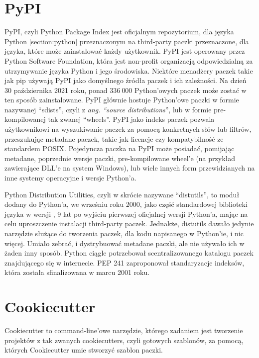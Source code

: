 \section{PyPI}
\label{section:pypi}
PyPI, \cite{PyPI} \cite{AdvancedPythonDevelopment} czyli Python Package Index jest oficjalnym repozytorium, dla języka Python \ref{section:python} przeznaczonym na third-party paczki przeznaczone, dla języka, które może zainstalować każdy użytkownik. PyPI jest operowany przez Python Software Foundation, która jest non-profit organizacją odpowiedzialną za utrzymywanie języka Python i jego  środowiska. Niektóre menadżery paczek takie jak pip \cite{Pip} używają PyPI jako domyślnego źródła paczek i ich zależności. Na dzień 30 października 2021 roku, ponad $336 \ 000$ Python'owych paczek może zostać w ten sposób zainstalowane. PyPI głównie hostuje Python'owe paczki w formie nazywanej ``sdists'', czyli z \textit{ang. ``source distributions}'', lub w formie pre-kompilowanej tak zwanej ``wheels''. PyPI jako indeks paczek pozwala użytkownikowi na wyszukiwanie paczek za pomocą konkretnych słów lub filtrów, przeszukując metadane paczek, takie jak licencje czy kompatybilność ze standardem POSIX. Pojedyncza paczka na PyPI może posiadać, pomijając metadane, poprzednie wersje paczki, pre-kompilowane wheel'e (na przykład zawierające DLL'e na system Windows), lub wiele innych form przewidzianych na inne systemy operacyjne i wersje Python'a.

Python Distribution Utilities, czyli w skrócie nazywane ``distutils'', to moduł dodany do Python'a, we wrześniu roku 2000, jako część standardowej biblioteki języka w wersji , 9 lat po wyjściu pierwszej oficjalnej wersji Python'a, mając na celu uproszczenie instalacji third-party paczek.
Jednakże, distutils dawało jedynie narzędzie służące do tworzenia paczek, dla kodu napisanego w Python'ie, i nic więcej. Umiało zebrać, i dystrybuować metadane paczki, ale nie używało ich w żaden inny sposób. Python ciągle potrzebował scentralizowanego katalogu paczek znajdującego się w internecie. PEP 241 \cite{PEP241} zaproponował standaryzacje indeksów, która została sfinalizowana w marcu 2001 roku.


\clearpage

\section{Cookiecutter}
\label{section:cookiecutter}
Cookiecutter \cite{CookieCutterDocumentation} \cite{CookiecutterGitHub} to command-line'owe narzędzie, którego zadaniem jest tworzenie projektów z tak zwanych cookiecutters, czyli gotowych szablonów, za pomocą, których Cookiecutter umie stworzyć szablon paczki.

